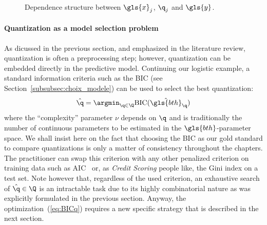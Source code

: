 \begin{figure}[!ht]
\centering
\begin{minipage}{0.45\textwidth}
\centering
{}
\caption{\label{fig:dep}Dependence structure between $\gls{x}_j$, $\q_j$ and $\gls{y}$.} 
\end{minipage}
\end{figure}

\paragraph{Quantization as a model selection problem} \label{par:model_selec}

As dicussed in the previous section, and emphasized in the literature review, quantization is often a preprocessing step; however, quantization can be embedded directly in the predictive model. Continuing our logistic example, a standard information criteria such as the BIC (see Section~\ref{subsubsec:choix_modele}) can be used to select the best quantization:
\begin{equation}
    \label{eq:BICq}
    \hat{\q}=\argmin_{\q \in \Q} \text{BIC}(\hat{\gls{bth}}_{\q})
\end{equation}
where the ``complexity'' parameter $\nu$ depends on ${\q}$ and is traditionally the number of continuous parameters to be estimated in the $\gls{bth}$-parameter space. We shall insist here on the fact that choosing the BIC as our gold standard to compare quantizations is only a matter of consistency throughout the chapters. The practitioner can swap this criterion with any other penalized criterion on training data such as AIC~\cite{akaike1973information} or, as \textit{Credit Scoring} people like, the Gini index on a test set. Note however that, regardless of the used criterion, an exhaustive search of $\hat{\q}\in\Q$ is an intractable task due to its highly combinatorial nature as was explicitly formulated in the previous section. Anyway, the optimization~(\ref{eq:BICq}) requires a new specific strategy that is described in the next section.

